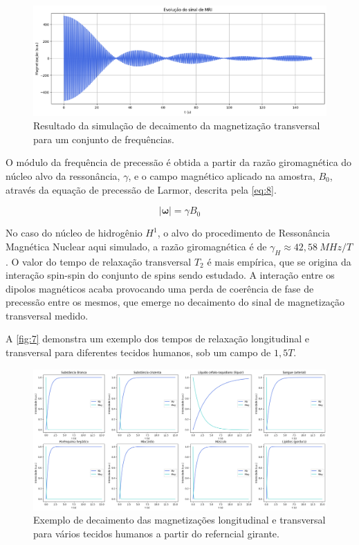 \documentclass[
12pt,		
twoside, 
a4paper,
chapter=TITLE,
english,			
brazil]{USPSC-classe/USPSC}
\begin{document}
\begin{figure} [H]
    \includegraphics[scale=0.28]{sinal_simulado.png}
    \centering
    \caption{Resultado da simulação de decaimento da magnetização transversal para um conjunto de frequências.}
    \label{fig:3}
\end{figure}

O módulo da frequência de precessão é obtida a partir da razão giromagnética do núcleo alvo da ressonância, $\gamma$, e o campo magnético aplicado na amostra, $B_0$, através 
da equação de precessão de Larmor, descrita pela \autoref{eq:8}.

\begin{equation} \label{eq:8}
    |\mathbf{\omega}| = \gamma B_0
\end{equation}

No caso do núcleo de hidrogênio $H^1$, o alvo do procedimento de Ressonância Magnética Nuclear aqui simulado, a razão giromagnética é de $\gamma_H \approx 42,58 \ MHz/T$. O valor do tempo de relaxação transversal $T_2$ é 
mais empírica, que se origina da interação spin-spin do conjunto de spins sendo estudado. A interação entre os dipolos magnéticos acaba provocando uma perda de coerência de fase de precessão entre os mesmos, 
que emerge no decaimento do sinal de magnetização transversal medido.

A \autoref{fig:7} demonstra um exemplo dos tempos de relaxação longitudinal e transversal \cite{Mazzola_2015} para diferentes tecidos humanos, sob um campo de $1,5T$. 

\begin{figure}[H]
    \includegraphics[scale=0.25]{T2.png}
    \centering
    \caption{Exemplo de decaimento das magnetizações longitudinal e transversal para vários tecidos humanos a partir do referncial girante.}
    \label{fig:7}
\end{figure}
\end{document}
